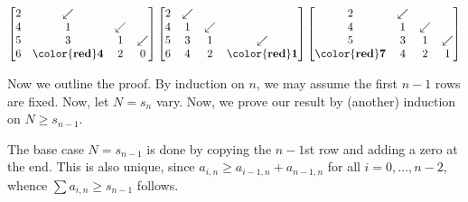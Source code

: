 \documentclass[11pt]{scrartcl}
\begin{document}
\[
  \begin{bmatrix}
    2 & \swarrow \\
    4 & 1 & \swarrow \\
    5 & 3 & 1 & \swarrow \\
    6 & \mathbf{\color{red} 4} & 2 & 0
  \end{bmatrix}
  \begin{bmatrix}
    2 & \swarrow \\
    4 & 1 & \swarrow \\
    5 & 3 & 1 & \swarrow \\
    6 & 4 & 2 & \mathbf{\color{red} 1}
  \end{bmatrix}
  \begin{bmatrix}
    2 & \swarrow \\
    4 & 1 & \swarrow \\
    5 & 3 & 1 & \swarrow \\
    \mathbf{\color{red} 7} & 4 & 2 & 1
  \end{bmatrix}
\]


Now we outline the proof.
By induction on $n$, we may assume the first $n-1$ rows are fixed.
Now, let $N = s_n$ vary.
Now, we prove our result by (another) induction on $N \ge s_{n-1}$.

The base case $N = s_{n-1}$ is done by copying
the $n-1$st row and adding a zero at the end.
This is also unique,
since $a_{i,n} \ge a_{i-1,n} + a_{n-1,n}$ for all $i=0, \dots, n-2$,
whence $\sum a_{i,n} \ge s_{n-1}$ follows.
\end{document}
